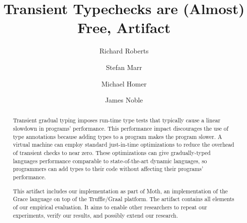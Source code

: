 \documentclass[a4paper,USenglish]{darts-v2019}
\title{Transient Typechecks are (Almost) Free, Artifact}
\author{Richard Roberts}{School of Design, Victoria University of Wellington}{rykardo.r@gmail.com}{https://orcid.org/0000-0002-3462-8539}{}
\author{Stefan Marr}{School of Computing, University of Kent}{s.marr@kent.ac.uk}{https://orcid.org/0000-0001-9059-5180}{}
\author{Michael Homer}{School of Engineering and Computer Science, Victoria University of Wellington}{mwh@ecs.vuw.ac.nz}{https://orcid.org/0000-0003-0280-6748}{}
\author{James Noble}{School of Engineering and Computer Science, Victoria University of Wellington}{kjx@ecs.vuw.ac.nz}{https://orcid.org/0000-0001-9036-5692}{}
\begin{document}
\maketitle

\begin{abstract}

  Transient gradual typing imposes run-time type tests that typically cause a
  linear slowdown in programs' performance.
  This performance impact discourages the use of type annotations
  because adding types to a program makes the program slower.
  A virtual machine can employ standard just-in-time optimizations to
  reduce the overhead of transient checks to near zero.
  These optimizations can give gradually-typed languages
  performance comparable to state-of-the-art dynamic languages,
  so programmers can add types to their code
  without affecting their programs' performance.

  This artifact includes our implementation as part of Moth,
  an implementation of the Grace language on top of the Truffle/Graal platform.
  The artifact contains all elements of our empirical evaluation.
  It aims to enable other researchers to repeat our experiments,
  verify our results, and possibly extend our research.
 \end{abstract}

\end{document}
